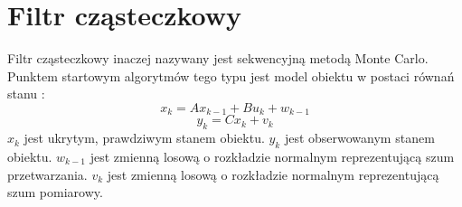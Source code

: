 
\section{Filtr cząsteczkowy}
\label{sec:filtrczasteczkowy}

Filtr cząsteczkowy inaczej nazywany jest sekwencyjną metodą Monte Carlo. Punktem startowym algorytmów tego typu jest model obiektu w postaci równań stanu \cite{Mukhtar}:
\begin{equation}
\label{eq:PF_state}
x_k=Ax_{k-1}+Bu_k+w_{k-1}
\end{equation}
\begin{equation}
y_k=Cx_k+v_k
\end{equation}
\(x_k\) jest ukrytym, prawdziwym stanem obiektu.\newline
\(y_k\) jest obserwowanym stanem obiektu.\newline
\(w_{k-1}\) jest zmienną losową o rozkładzie normalnym reprezentującą szum przetwarzania.\newline
\(v_k\) jest zmienną losową o rozkładzie normalnym reprezentującą szum pomiarowy.\newline

